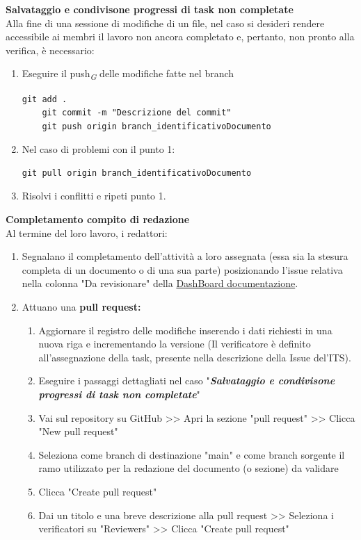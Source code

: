 \documentclass{article}
\begin{document}
     \textbf{Salvataggio e condivisone progressi di task non completate}\\
    Alla fine di una sessione di modifiche di un file, nel caso si desideri rendere accessibile ai membri il lavoro non ancora completato e, pertanto, non pronto alla verifica, è necessario:
    \begin{enumerate}
        \item Eseguire il push\textsubscript{\textit{G}}  delle modifiche fatte nel branch 
        \begin{lstlisting}[style=code]
    git add .
    git commit -m "Descrizione del commit"
    git push origin branch_identificativoDocumento
        \end{lstlisting}

        \item Nel caso di problemi con il punto 1:
        \begin{lstlisting}[style=code]
   git pull origin branch_identificativoDocumento
        \end{lstlisting}
        \item Risolvi i conflitti e ripeti punto 1.
    \end{enumerate}
\vspace{0.3cm}
     \textbf{Completamento compito di redazione}\\
    Al termine del loro lavoro, i redattori:
    \begin{enumerate}
        \item Segnalano il completamento dell'attività a loro assegnata (essa sia la stesura completa di un documento o di una sua parte) posizionando l'issue relativa nella colonna "Da revisionare" della  \href{https://github.com/orgs/ByteOps-swe/projects/1/views/1}{DashBoard documentazione}.
        \item Attuano una \textbf{pull request:}
        \begin{enumerate}
     \item Aggiornare il registro delle modifiche inserendo i dati richiesti in  una nuova riga e incrementando la versione (Il verificatore è definito all'assegnazione della task, presente nella descrizione della Issue del'ITS).
        \item Eseguire i passaggi dettagliati nel caso "\textit{\textbf{Salvataggio e condivisone progressi di task non completate}}"
        \item Vai sul repository su GitHub >> Apri la sezione "pull request" >> Clicca "New pull request"
        \item Seleziona come branch di destinazione "main" e come branch sorgente il ramo utilizzato per la redazione del documento (o sezione) da validare
        \item Clicca "Create pull request"
        \item Dai un titolo e una breve descrizione alla pull request >> Seleziona i verificatori su "Reviewers" >> Clicca "Create pull request"
    \end{enumerate}
    \end{enumerate}
    
\end{document}
